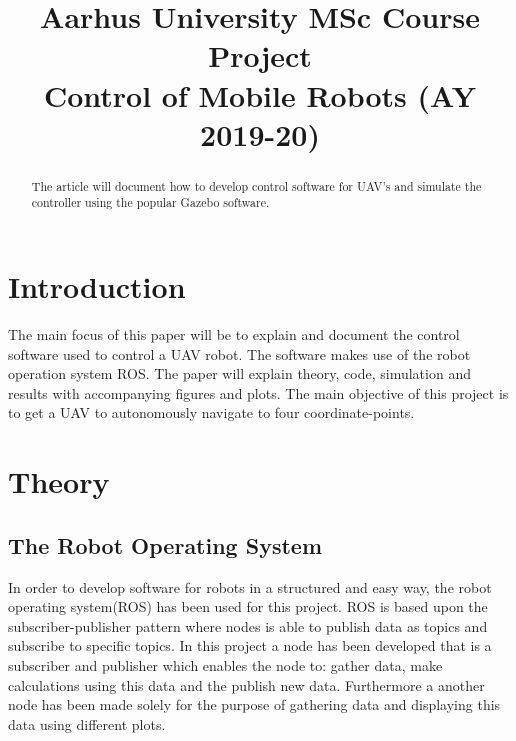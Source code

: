 \documentclass[conference]{IEEEtran}
\begin{document}
\title{Aarhus University MSc Course Project  \\ Control of Mobile Robots (AY 2019-20)}

\author{
}

\maketitle

\begin{abstract}

The article will document how to develop control software for UAV's and simulate the controller using the popular Gazebo software. 	

\end{abstract}

\section{Introduction}
The main focus of this paper will be to explain and document the control software used to control a UAV robot. The software makes use of the robot operation system ROS. The paper will explain theory, code, simulation and results with accompanying figures and plots. The main objective of this project is to get a UAV to autonomously navigate to four coordinate-points.

\section{Theory}\label{theory}
\subsection{The Robot Operating System}
In order to develop software for robots in a structured and easy way, the robot operating system(ROS)\cite{ros} has been used for this project. ROS is based upon the subscriber-publisher pattern where nodes is able to publish data as topics and subscribe to specific topics. In this project a node has been developed that is a subscriber and publisher which enables the node to: gather data, make calculations using this data and the publish new data. Furthermore a another node has been made solely for the purpose of gathering data and displaying this data using different plots.
\end{document}
